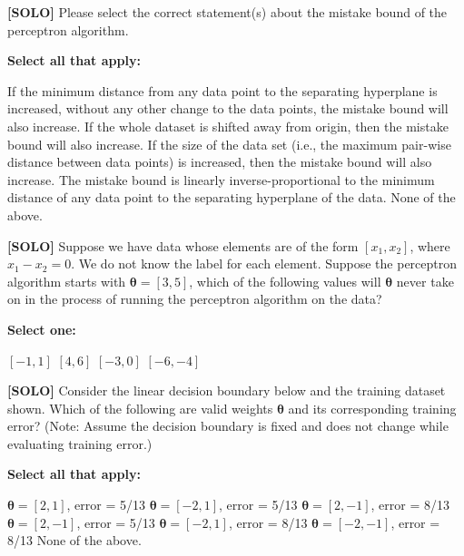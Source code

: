 \documentclass[11pt,addpoints,answers]{exam}
\begin{document}
\begin{questions}
    
    
    

    
    \question[2] \textbf{[SOLO]} Please select the correct statement(s) about the mistake bound of the perceptron algorithm. 

    \textbf{Select all that apply:}
    {%
    \checkboxchar{$\Box$} \checkedchar{$\blacksquare$}
    \begin{checkboxes}
        \choice If the minimum distance from any data point to the separating hyperplane is increased, without any other change to the data points, the mistake bound will also increase.
        \choice If the whole dataset is shifted away from origin, then the mistake bound will also increase.
        \choice If the size of the data set (i.e., the maximum pair-wise distance between data points) is increased, then the mistake bound will also increase.
        \choice The mistake bound is linearly inverse-proportional to the minimum distance of any data point to the separating hyperplane of the data.
        \choice None of the above.
    \end{checkboxes}
    }



    \clearpage

    \question[2] \textbf{[SOLO]} Suppose we have data whose elements are of the form $[x_1,x_2]$, where $x_1 - x_2 = 0$. We do not know the label for each element. Suppose the perceptron algorithm starts with $\bm{\theta} = [3,5]$, which of the following values will $\bm{\theta}$ never take on in the process of running the perceptron algorithm on the data?

    \textbf{Select one:}
    \begin{checkboxes}
        \choice $[-1,1]$
        \choice $[4,6]$
        \choice $[-3,0]$
        \choice $[-6,-4]$
    \end{checkboxes}

    
    \question[2] \textbf{[SOLO]} Consider the linear decision boundary below and the training dataset shown. Which of the following are valid weights $\bm{\theta}$ and its corresponding training error? (Note: Assume the decision boundary is fixed and does not change while evaluating training error.)
    
    \textbf{Select all that apply:}
    {%
    \checkboxchar{$\Box$} \checkedchar{$\blacksquare$}
    \begin{checkboxes}
        \choice $\bm{\theta} = [2,1]$, error  = 5/13
        \choice $\bm{\theta} = [-2,1]$, error = 5/13
        \choice $\bm{\theta} = [2,-1]$, error = 8/13
        \choice $\bm{\theta} = [2,-1]$, error = 5/13
        \choice $\bm{\theta} = [-2,1]$, error = 8/13
        \choice $\bm{\theta} = [-2,-1]$, error = 8/13
        \choice None of the above.
    \end{checkboxes}
    }
    

\end{questions}
\end{document}
